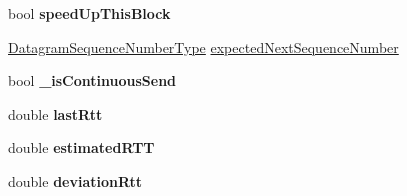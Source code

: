 \begin{DoxyCompactItemize}
\item 
\hypertarget{class_rak_net_1_1_c_c_rak_net_sliding_window_ae71d77e1f88a970e0e725f5528ce8e88}{bool {\bfseries speed\-Up\-This\-Block}}\label{class_rak_net_1_1_c_c_rak_net_sliding_window_ae71d77e1f88a970e0e725f5528ce8e88}

\item 
\hyperlink{struct_rak_net_1_1uint24__t}{Datagram\-Sequence\-Number\-Type} \hyperlink{class_rak_net_1_1_c_c_rak_net_sliding_window_aad7867d1a9fb971f16450dbb769c31ef}{expected\-Next\-Sequence\-Number}
\item 
\hypertarget{class_rak_net_1_1_c_c_rak_net_sliding_window_a496f4a364a82c51f2bb35ae1eb5c6f5a}{bool {\bfseries \-\_\-is\-Continuous\-Send}}\label{class_rak_net_1_1_c_c_rak_net_sliding_window_a496f4a364a82c51f2bb35ae1eb5c6f5a}

\item 
\hypertarget{class_rak_net_1_1_c_c_rak_net_sliding_window_ad5927e5be2902a3e896a21f9b31a32b1}{double {\bfseries last\-Rtt}}\label{class_rak_net_1_1_c_c_rak_net_sliding_window_ad5927e5be2902a3e896a21f9b31a32b1}

\item 
\hypertarget{class_rak_net_1_1_c_c_rak_net_sliding_window_ad2def10c66bc8f84fee068732ca898c3}{double {\bfseries estimated\-R\-T\-T}}\label{class_rak_net_1_1_c_c_rak_net_sliding_window_ad2def10c66bc8f84fee068732ca898c3}

\item 
\hypertarget{class_rak_net_1_1_c_c_rak_net_sliding_window_a8d7180920f830e983ed5e616268a7b59}{double {\bfseries deviation\-Rtt}}\label{class_rak_net_1_1_c_c_rak_net_sliding_window_a8d7180920f830e983ed5e616268a7b59}

\end{DoxyCompactItemize}


